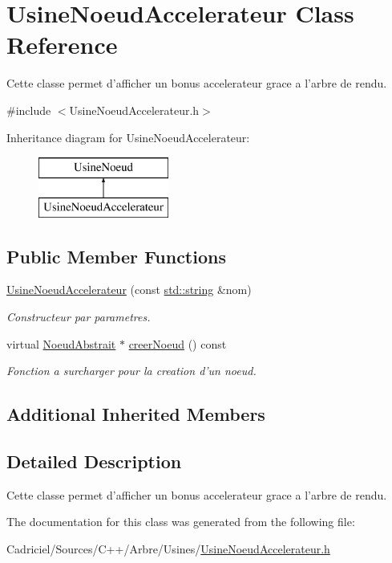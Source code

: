 \hypertarget{class_usine_noeud_accelerateur}{\section{Usine\-Noeud\-Accelerateur Class Reference}
\label{class_usine_noeud_accelerateur}
}


Cette classe permet d'afficher un bonus accelerateur grace a l'arbre de rendu.  




{\ttfamily \#include $<$Usine\-Noeud\-Accelerateur.\-h$>$}

Inheritance diagram for Usine\-Noeud\-Accelerateur\-:\begin{figure}[H]
\begin{center}
\leavevmode
\includegraphics[height=2.000000cm]{class_usine_noeud_accelerateur}
\end{center}
\end{figure}
\subsection*{Public Member Functions}
\begin{DoxyCompactItemize}
\item 
\hyperlink{group__inf2990_ga2738f2b5f1c5816f359695824167ae83}{Usine\-Noeud\-Accelerateur} (const \hyperlink{glew_8h_ae84541b4f3d8e1ea24ec0f466a8c568b}{std\-::string} \&nom)
\begin{DoxyCompactList}\small\item\em Constructeur par parametres. \end{DoxyCompactList}\item 
virtual \hyperlink{class_noeud_abstrait}{Noeud\-Abstrait} $\ast$ \hyperlink{group__inf2990_gac930b86cf1f3e8861f6b8af11df2c8cb}{creer\-Noeud} () const 
\begin{DoxyCompactList}\small\item\em Fonction a surcharger pour la creation d'un noeud. \end{DoxyCompactList}\end{DoxyCompactItemize}
\subsection*{Additional Inherited Members}


\subsection{Detailed Description}
Cette classe permet d'afficher un bonus accelerateur grace a l'arbre de rendu. 

The documentation for this class was generated from the following file\-:\begin{DoxyCompactItemize}
\item 
Cadriciel/\-Sources/\-C++/\-Arbre/\-Usines/\hyperlink{_usine_noeud_accelerateur_8h}{Usine\-Noeud\-Accelerateur.\-h}\end{DoxyCompactItemize}
